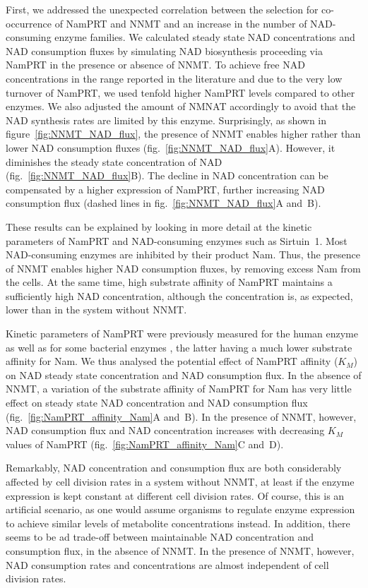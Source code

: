 First, we addressed the unexpected correlation between the selection for co-occurrence of NamPRT and NNMT and an increase in the number of NAD-consuming enzyme families. We calculated steady state NAD concentrations and NAD consumption fluxes by simulating NAD biosynthesis proceeding via NamPRT in the presence or absence of NNMT. To achieve free NAD concentrations in the range reported in the literature and due to the very low turnover of NamPRT, we used tenfold higher NamPRT levels compared to other enzymes. We also adjusted the amount of NMNAT accordingly to avoid that the NAD synthesis rates are limited by this enzyme. Surprisingly, as shown in figure~\ref{fig:NNMT_NAD_flux}, the presence of NNMT enables higher rather than lower NAD consumption fluxes (fig.~\ref{fig:NNMT_NAD_flux}A). However, it diminishes the steady state concentration of NAD (fig.~\ref{fig:NNMT_NAD_flux}B). The decline in NAD concentration can be compensated by a higher expression of NamPRT, further increasing NAD consumption flux (dashed lines in fig.~\ref{fig:NNMT_NAD_flux}A and~B).

These results can be explained by looking in more detail at the kinetic parameters of NamPRT and NAD-consuming enzymes such as Sirtuin~1. Most NAD-consuming enzymes are inhibited by their product Nam. Thus, the presence of NNMT enables higher NAD consumption fluxes, by removing excess Nam from the cells. At the same time, high substrate affinity of NamPRT maintains a sufficiently high NAD concentration, although the concentration is, as expected, lower than in the system without NNMT.

Kinetic parameters of NamPRT were previously measured for the human enzyme \cite{Burgos2008} as well as for some bacterial enzymes \cite{Sorci2010}, the latter having a much lower substrate affinity for Nam. We thus analysed the potential effect of NamPRT affinity ($K_{M}$) on NAD steady state concentration and NAD consumption flux. In the absence of NNMT, a variation of the substrate affinity of NamPRT for Nam has very little effect on steady state NAD concentration and NAD consumption flux (fig.~\ref{fig:NamPRT_affinity_Nam}A and~B). In the presence of NNMT, however, NAD consumption flux and NAD concentration increases with decreasing $K_{M}$ values of NamPRT (fig.~\ref{fig:NamPRT_affinity_Nam}C and~D).

Remarkably, NAD concentration and consumption flux are both considerably affected by cell division rates in a system without NNMT, at least if the enzyme expression is kept constant at different cell division rates. Of course, this is an artificial scenario, as one would assume organisms to regulate enzyme expression to achieve similar levels of metabolite concentrations instead. 
In addition, there seems to be ad trade-off  between maintainable NAD concentration and consumption flux, in the absence of NNMT. In the presence of NNMT, however, NAD consumption rates and concentrations are almost independent of cell division rates.


